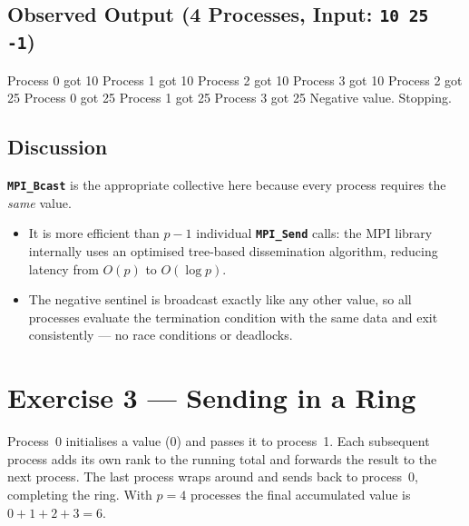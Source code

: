 \documentclass[12pt,a4paper]{article}
\newcommand{\mpiname}[1]{\texttt{\textbf{#1}}}
\begin{document}
\subsection{Observed Output (4 Processes, Input: \texttt{10 25 -1})}

\begin{outputbox}
Process 0 got 10
Process 1 got 10
Process 2 got 10
Process 3 got 10
Process 2 got 25
Process 0 got 25
Process 1 got 25
Process 3 got 25
Negative value. Stopping.
\end{outputbox}

\subsection{Discussion}

\begin{answerbox}
\mpiname{MPI\_Bcast} is the appropriate collective here because every
process requires the \emph{same} value.

\begin{itemize}[nosep, leftmargin=1.2em]
  \item It is more efficient than $p-1$ individual \mpiname{MPI\_Send}
        calls: the MPI library internally uses an optimised tree-based
        dissemination algorithm, reducing latency from $O(p)$ to
        $O(\log p)$.
  \item The negative sentinel is broadcast exactly like any other value,
        so all processes evaluate the termination condition with the same
        data and exit consistently — no race conditions or deadlocks.
\end{itemize}
\end{answerbox}

\newpage
\section{Exercise 3 — Sending in a Ring}

Process~0 initialises a value (0) and passes it to process~1.
Each subsequent process adds its own rank to the running total and
forwards the result to the next process.
The last process wraps around and sends back to process~0, completing the
ring.
With $p = 4$ processes the final accumulated value is
$0 + 1 + 2 + 3 = 6$.
\end{document}

